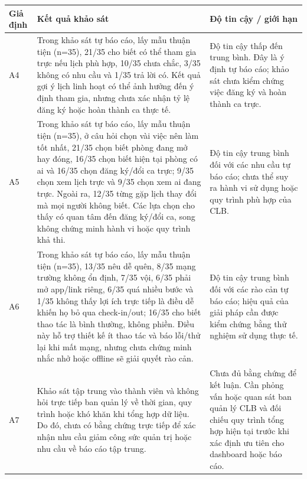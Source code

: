 {\centering
\begin{tabularx}{0.94\textwidth}{|>{\raggedright\arraybackslash}p{}|>{\raggedright\arraybackslash}p{}|X|}
\hline
\textbf{Giả định} & \textbf{Kết quả khảo sát} & \textbf{Độ tin cậy / giới hạn} \\ \hline
A4 & Trong khảo sát tự báo cáo, lấy mẫu thuận tiện (n=35), 21/35 cho biết có thể tham gia trực nếu lịch phù hợp, 10/35 chưa chắc, 3/35 không có nhu cầu và 1/35 trả lời có. Kết quả gợi ý lịch linh hoạt có thể ảnh hưởng đến ý định tham gia, nhưng chưa xác nhận tỷ lệ đăng ký hoặc hoàn thành ca thực tế. & Độ tin cậy thấp đến trung bình. Đây là ý định tự báo cáo; khảo sát chưa kiểm chứng việc đăng ký và hoàn thành ca trực. \\ \hline
A5 & Trong khảo sát tự báo cáo, lấy mẫu thuận tiện (n=35), ở câu hỏi chọn vài việc nên làm tốt nhất, 21/35 chọn biết phòng đang mở hay đóng, 16/35 chọn biết hiện tại phòng có ai và 16/35 chọn đăng ký/đổi ca trực; 9/35 chọn xem lịch trực và 9/35 chọn xem ai đang trực. Ngoài ra, 12/35 từng gặp lịch thay đổi mà mọi người không biết. Các lựa chọn cho thấy có quan tâm đến đăng ký/đổi ca, song không chứng minh hành vi hoặc quy trình khả thi. & Độ tin cậy trung bình đối với các nhu cầu tự báo cáo; chưa thể suy ra hành vi sử dụng hoặc quy trình phù hợp của CLB. \\ \hline
A6 & Trong khảo sát tự báo cáo, lấy mẫu thuận tiện (n=35), 13/35 nêu dễ quên, 8/35 mạng trường không ổn định, 7/35 vội, 6/35 phải mở app/link riêng, 6/35 quá nhiều bước và 1/35 không thấy lợi ích trực tiếp là điều dễ khiến họ bỏ qua check-in/out; 16/35 cho biết thao tác là bình thường, không phiền. Điều này hỗ trợ thiết kế ít thao tác và báo lỗi/thử lại khi mất mạng, nhưng chưa chứng minh nhắc nhở hoặc offline sẽ giải quyết rào cản. & Độ tin cậy trung bình đối với các rào cản tự báo cáo; hiệu quả của giải pháp cần được kiểm chứng bằng thử nghiệm sử dụng thực tế. \\ \hline
A7 & Khảo sát tập trung vào thành viên và không hỏi trực tiếp ban quản lý về thời gian, quy trình hoặc khó khăn khi tổng hợp dữ liệu. Do đó, chưa có bằng chứng trực tiếp để xác nhận nhu cầu giảm công sức quản trị hoặc nhu cầu về báo cáo tập trung. & Chưa đủ bằng chứng để kết luận. Cần phỏng vấn hoặc quan sát ban quản lý CLB và đối chiếu quy trình tổng hợp hiện tại trước khi xác định ưu tiên cho dashboard hoặc báo cáo. \\ \hline
\end{tabularx}\par}
\setlength{\tabcolsep}{6pt}
\setlength{\extrarowheight}{0pt}
